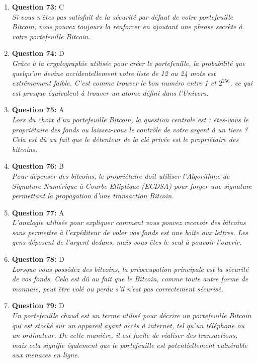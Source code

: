 \documentclass[12pt,a4paper]{article}
\begin{document}
\begin{enumerate}
\item \textbf{Question 73:} C
\\ \textit{Si vous n'êtes pas satisfait de la sécurité par défaut de votre portefeuille Bitcoin, vous pouvez toujours la renforcer en ajoutant une phrase secrète à votre portefeuille Bitcoin.}

\item \textbf{Question 74:} D
\\ \textit{Grâce à la cryptographie utilisée pour créer le portefeuille, la probabilité que quelqu'un devine accidentellement votre liste de 12 ou 24 mots est extrêmement faible. C'est comme trouver le bon numéro entre 1 et $2^256$, ce qui est presque équivalent à trouver un atome défini dans l'Univers.}

\item \textbf{Question 75:} A
\\ \textit{Lors du choix d'un portefeuille Bitcoin, la question centrale est : êtes-vous le propriétaire des fonds ou laissez-vous le contrôle de votre argent à un tiers ? Cela est dû au fait que le détenteur de la clé privée est le propriétaire des bitcoins.}

\item \textbf{Question 76:} B
\\ \textit{Pour dépenser des bitcoins, le propriétaire doit utiliser l'Algorithme de Signature Numérique à Courbe Elliptique (ECDSA) pour forger une signature permettant la propagation d'une transaction Bitcoin.}

\item \textbf{Question 77:} A
\\ \textit{L'analogie utilisée pour expliquer comment vous pouvez recevoir des bitcoins sans permettre à l'expéditeur de voler vos fonds est une boîte aux lettres. Les gens déposent de l'argent dedans, mais vous êtes le seul à pouvoir l'ouvrir.}

\item \textbf{Question 78:} D
\\ \textit{Lorsque vous possédez des bitcoins, la préoccupation principale est la sécurité de vos fonds. Cela est dû au fait que le Bitcoin, comme toute autre forme de monnaie, peut être volé ou perdu s'il n'est pas correctement sécurisé.}

\item \textbf{Question 79:} D
\\ \textit{Un portefeuille chaud est un terme utilisé pour décrire un portefeuille Bitcoin qui est stocké sur un appareil ayant accès à internet, tel qu'un téléphone ou un ordinateur. De cette manière, il est facile de réaliser des transactions, mais cela signifie également que le portefeuille est potentiellement vulnérable aux menaces en ligne.}


\end{enumerate}
\end{document}
